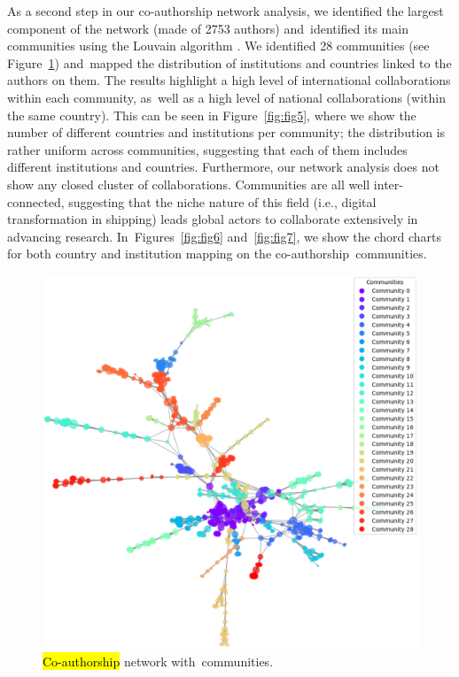 \documentclass[jmse,review,accept,pdftex,moreauthors]{Definitions/mdpi}
\begin{document}
As a second step in our co-authorship network analysis, we identified the largest component of the network (made of 2753 authors) and~identified its main communities using the Louvain algorithm \citep{blondel2008fast}. We identified 28 communities (see Figure~\ref{fig:fig4}) and~mapped  the distribution of institutions and countries linked to the authors on them. The results highlight a high level of international collaborations within each community, as~well as a high level of national collaborations (within the same country). This can be seen in Figure~\ref{fig:fig5}, where we show the number of different countries and institutions per community; the distribution is rather uniform across communities, suggesting that each of them includes different institutions and countries. Furthermore, our network analysis does not show {any} %
closed cluster of collaborations. Communities are all well inter-connected, suggesting that the niche nature of this field (i.e., digital transformation in shipping) leads global actors to collaborate extensively in advancing research. In~Figures~\ref{fig:fig6} and~\ref{fig:fig7}, we show the chord charts for both country and institution mapping on the co-authorship~communities.



\begin{figure}[H]

\hspace{-30pt}	\includegraphics[width=\linewidth]{pics/co-authorship_communities.eps}
\vspace{-20pt}
	\caption{\hl{Co-authorship} %
 network with~communities.}\label{fig:fig4}
\end{figure}
\unskip
\end{document}
